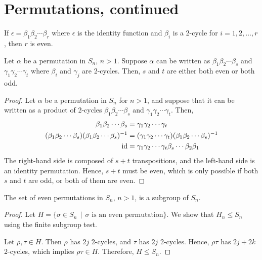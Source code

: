 \section{Permutations, continued}
    \renewcommand{\leftmark}{April 17, 2024}

    \begin{thm}
        If \(\epsilon = \beta_1\beta_2\cdots\beta_r\) where \(\epsilon\) is the identity function and \(\beta_i\) is a 2-cycle for \(i = 1, 2, \ldots, r\), then \(r\) is even.
    \end{thm}

    \begin{thm}
        Let \(\alpha\) be a permutation in \(S_n\), \(n > 1\). Suppose \(\alpha\) can be written as \(\beta_1\beta_2\cdots\beta_s\) and \(\gamma_1\gamma_2\cdots\gamma_t\) where \(\beta_i\) and \(\gamma_j\) are 2-cycles. Then, \(s\) and \(t\) are either both even or both odd.
    \end{thm}

    \begin{proof}
        Let \(\alpha\) be a permutation in \(S_n\) for \(n > 1\), and suppose that it can be written as a product of 2-cycles \(\beta_1\beta_2\cdots\beta_s\) and \(\gamma_1\gamma_2\cdots\gamma_t\). Then,
        \begin{align*}
            \beta_1\beta_2\cdots\beta_s &= \gamma_1\gamma_2\cdots\gamma_t \\
            (\beta_1\beta_2\cdots\beta_s)(\beta_1\beta_2\cdots\beta_s)^{-1} &= (\gamma_1\gamma_2\cdots\gamma_t)(\beta_1\beta_2\cdots\beta_s)^{-1} \\
            \operatorname{id} &= \gamma_1\gamma_2\cdots\gamma_t\beta_s\cdots\beta_2\beta_1
        \end{align*}
        The right-hand side is composed of \(s + t\) transpositions, and the left-hand side is an identity permutation. Hence, \(s + t\) must be even, which is only possible if both \(s\) and \(t\) are odd, or both of them are even.
    \end{proof}

    \begin{thm}
        The set of even permutations in \(S_n\), \(n > 1\), is a subgroup of \(S_n\).
    \end{thm}

    \begin{proof}
        Let \(H = \{\sigma\in S_n \,\mid\, \sigma\text{ is an even permutation}\}\). We show that \(H_n \leq S_n\) using the finite subgroup test.

        Let \(\rho, \tau\in H\). Then \(\rho\) has \(2j\) 2-cycles, and \(\tau\) has \(2j\) 2-cycles. Hence, \(\rho\tau\) has \(2j + 2k\) 2-cycles, which implies \(\rho\tau\in H\). Therefore, \(H \leq S_n\).
    \end{proof}


